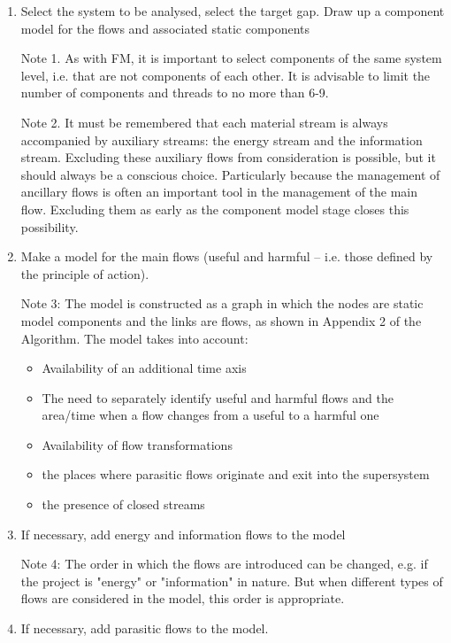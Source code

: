 \documentclass[a4paper,11pt]{article}
\begin{document}
\begin{enumerate}
\item Select the system to be analysed, select the target gap. Draw up a
  component model for the flows and associated static components

  Note 1. As with FM, it is important to select components of the same system
  level, i.e. that are not components of each other. It is advisable to limit
  the number of components and threads to no more than 6-9.

  Note 2. It must be remembered that each material stream is always
  accompanied by auxiliary streams: the energy stream and the information
  stream. Excluding these auxiliary flows from consideration is possible, but
  it should always be a conscious choice. Particularly because the management
  of ancillary flows is often an important tool in the management of the main
  flow. Excluding them as early as the component model stage closes this
  possibility.

\item Make a model for the main flows (useful and harmful -- i.e. those
  defined by the principle of action).

  Note 3: The model is constructed as a graph in which the nodes are static
  model components and the links are flows, as shown in Appendix 2 of the
  Algorithm. The model takes into account:
  \begin{itemize}
  \item Availability of an additional time axis
  \item The need to separately identify useful and harmful flows and the
    area/time when a flow changes from a useful to a harmful one
  \item Availability of flow transformations
  \item the places where parasitic flows originate and exit into the
    supersystem
  \item the presence of closed streams
  \end{itemize}
\item If necessary, add energy and information flows to the model

  Note 4: The order in which the flows are introduced can be changed, e.g. if
  the project is "energy" or "information" in nature. But when different types
  of flows are considered in the model, this order is appropriate.

\item If necessary, add parasitic flows to the model.


\end{enumerate}
\end{document}
